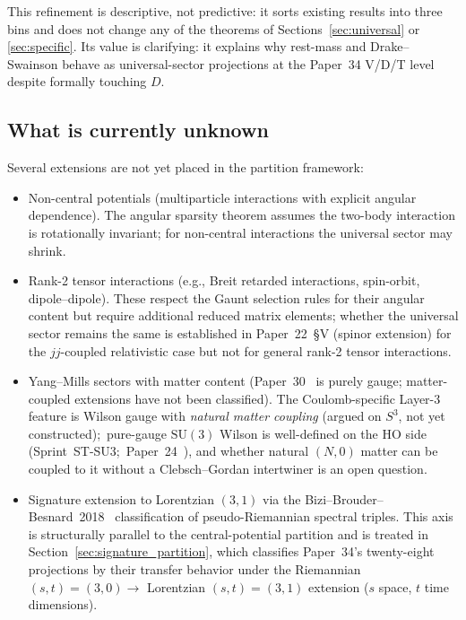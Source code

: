 \documentclass[twocolumn,pra,amsmath,amssymb,superscriptaddress]{revtex4-2}
\begin{document}
This refinement is descriptive, not predictive: it sorts existing
results into three bins and does not change any of the theorems of
Sections~\ref{sec:universal} or
\ref{sec:specific}.  Its value is clarifying:
it explains why rest-mass and Drake--Swainson behave as
universal-sector projections at the Paper~34 V/D/T level despite
formally touching $D$.

\subsection{What is currently unknown}

Several extensions are not yet placed in the partition framework:

\begin{itemize}
\item Non-central potentials (multiparticle interactions with
  explicit angular dependence).  The angular sparsity theorem
  assumes the two-body interaction is rotationally invariant; for
  non-central interactions the universal sector may shrink.
\item Rank-2 tensor interactions (e.g., Breit retarded interactions,
  spin-orbit, dipole--dipole).  These respect the Gaunt selection
  rules for their angular content but require additional reduced
  matrix elements; whether the universal sector remains the same
  is established in Paper~22~\S V (spinor extension) for the
  $jj$-coupled relativistic case but not for general rank-2 tensor
  interactions.
\item Yang--Mills sectors with matter content (Paper~30~\cite{paper30}
  is purely gauge; matter-coupled extensions have not been
  classified).  The Coulomb-specific Layer-3 feature is Wilson gauge
  with \emph{natural matter coupling} (argued on $S^3$, not yet
  constructed);\ pure-gauge $\mathrm{SU}(3)$ Wilson is well-defined
  on the HO side (Sprint~ST-SU3;\ Paper~24~\cite{paper24}), and whether natural
  $(N,0)$ matter can be coupled to it without a Clebsch--Gordan
  intertwiner is an open question.
\item Signature extension to Lorentzian $(3, 1)$ via the
  Bizi--Brouder--Besnard~2018~\cite{bizi_brouder_besnard2018}
  classification of pseudo-Riemannian spectral triples.  This
  axis is structurally parallel to the central-potential
  partition and is treated in
  Section~\ref{sec:signature_partition}, which classifies
  Paper~34's twenty-eight projections by their transfer behavior
  under the Riemannian $(s, t) = (3, 0) \to$ Lorentzian $(s, t) = (3, 1)$
  extension ($s$ space, $t$ time dimensions).
\end{itemize}
\end{document}
